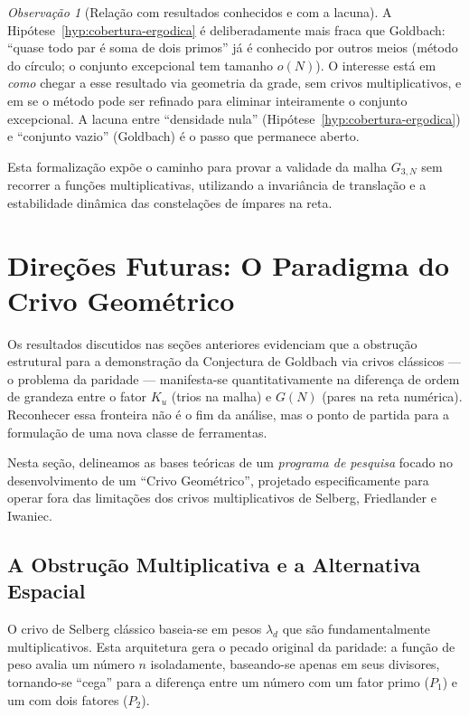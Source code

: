 \documentclass[12pt,a4paper]{article}
\theoremstyle{remark}
\newtheorem{remark}[theorem]{Observa\c{c}\~ao}
\begin{document}
	\begin{remark}[Rela\c{c}\~ao com resultados conhecidos e com a lacuna]
		A Hip\'otese~\ref{hyp:cobertura-ergodica} \'e deliberadamente mais fraca que Goldbach:
		``quase todo par \'e soma de dois primos'' j\'a \'e conhecido por outros meios
		(m\'etodo do c\'irculo; o conjunto excepcional tem tamanho $o(N)$).
		O interesse est\'a em \emph{como} chegar a esse resultado via geometria da grade,
		sem crivos multiplicativos, e em se o m\'etodo pode ser refinado para eliminar
		inteiramente o conjunto excepcional.
		A lacuna entre ``densidade nula'' (Hip\'otese~\ref{hyp:cobertura-ergodica}) e
		``conjunto vazio'' (Goldbach) \'e o passo que permanece aberto.
	\end{remark}
	
	Esta formaliza\c{c}\~ao exp\~oe o caminho para provar a validade da malha $G_{3,N}$
	sem recorrer a fun\c{c}\~oes multiplicativas, utilizando a invari\^ancia de
	transla\c{c}\~ao e a estabilidade din\^amica das constela\c{c}\~oes de \'impares na reta.
	
	\section{Direções Futuras: O Paradigma do Crivo Geométrico}
	\label{sec:crivo_geometrico}
	
	Os resultados discutidos nas seções anteriores evidenciam que a obstrução estrutural para a demonstração da Conjectura de Goldbach via crivos clássicos --- o problema da paridade --- manifesta-se quantitativamente na diferença de ordem de grandeza entre o fator $K_u$ (trios na malha) e $G(N)$ (pares na reta numérica). Reconhecer essa fronteira não é o fim da análise, mas o ponto de partida para a formulação de uma nova classe de ferramentas.
	
	Nesta seção, delineamos as bases teóricas de um \textit{programa de pesquisa} focado no desenvolvimento de um ``Crivo Geométrico'', projetado especificamente para operar fora das limitações dos crivos multiplicativos de Selberg, Friedlander e Iwaniec.
	
	\subsection{A Obstrução Multiplicativa e a Alternativa Espacial}
	
	O crivo de Selberg clássico baseia-se em pesos $\lambda_d$ que são fundamentalmente multiplicativos. Esta arquitetura gera o pecado original da paridade: a função de peso avalia um número $n$ isoladamente, baseando-se apenas em seus divisores, tornando-se ``cega'' para a diferença entre um número com um fator primo ($P_1$) e um com dois fatores ($P_2$).
	
\end{document}
